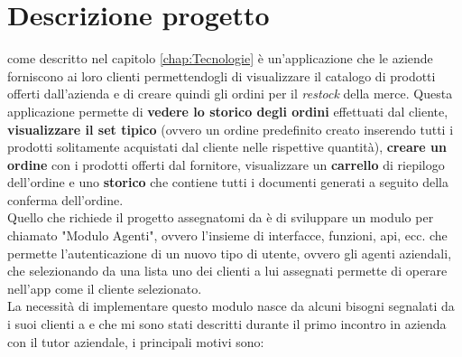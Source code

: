 \section{Descrizione progetto}
{\movi} come descritto nel capitolo \ref{chap:Tecnologie} è un'applicazione che le aziende forniscono ai loro clienti 
permettendogli di visualizzare il catalogo di prodotti offerti dall'azienda e di creare quindi gli ordini per il \textit{restock} 
della merce. Questa applicazione permette di \textbf{vedere lo storico degli ordini} effettuati dal cliente, \textbf{visualizzare il 
set tipico} (ovvero un ordine predefinito creato inserendo tutti i prodotti solitamente acquistati dal cliente nelle rispettive quantità), 
\textbf{creare un ordine} con i prodotti offerti dal fornitore, visualizzare un \textbf{carrello} di riepilogo dell'ordine e uno \textbf{storico} che 
contiene tutti i documenti generati a seguito della conferma dell'ordine.\\
Quello che richiede il progetto assegnatomi da {\company} è di sviluppare un modulo per {\movi} chiamato "Modulo Agenti", ovvero 
l'insieme di interfacce, funzioni, \gls{api}, ecc. che permette l'autenticazione di un nuovo tipo di utente, ovvero gli agenti aziendali, 
che selezionando da una lista uno dei clienti a lui assegnati permette di operare nell'app come il cliente selezionato.\\
La necessità di implementare questo modulo nasce da alcuni bisogni segnalati da i suoi clienti a {\company} e che 
mi sono stati descritti durante il primo incontro in azienda con il tutor aziendale, i principali motivi sono:
